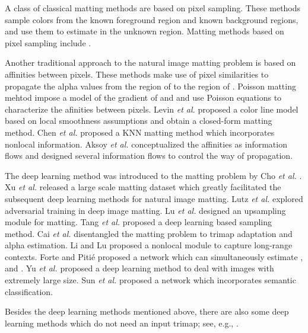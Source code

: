 \documentclass{article}
\theoremstyle{plain}
\begin{document}
A class of classical matting methods are based on pixel sampling.
These methods sample colors from the known foreground region and known background regions, and use them to estimate  in the unknown region.
Matting methods based on pixel sampling include
\cite{Chuang2001ABayesianApproach,Wang2007OptimizedColorSampling,Gastal2010SharedSampling,He2011AGlobalSampling,Shahrian2013ImprovingImageMatting,Feng2016AClusterSampling}.

Another traditional approach to the natural image matting problem is based on affinities between pixels.
These methods make use of pixel similarities to propagate the alpha values from the region of  to the region of .
Poisson matting mehtod \cite{Sun2004PoissonMatting} impose a model of the gradient of  and  and use Poisson equations to characterize the afinities between pixels.
Levin \emph{et al.} \cite{Levin2008AClosed-Form} proposed a color line model based on local smoothness assumptions and obtain a closed-form matting method.
Chen \emph{et al.} \cite{Chen2013KNNMatting} proposed a KNN matting method which incorporates nonlocal information.
Aksoy \emph{et al.} \cite{Aksoy2017DesigningEffective} conceptualized the affinities as information flows and designed several information flows to control the way of propagation.

The deep learning method was introduced to the matting problem by
Cho \emph{et al.} \cite{Cho2016NaturalImageMatting}. Xu \emph{et al.} \cite{Xu2017DeepImageMatting} released a large scale matting dataset which greatly facilitated the subsequent deep learning methods for natural image matting.
Lutz \emph{et al.} \cite{Lutz2018AlphaGAN} explored adversarial training in deep image matting.
Lu \emph{et al.} \cite{Lu2019IndicesMatter} designed an upsampling module for matting.
Tang \emph{et al.} \cite{Tang2019Learning-Based} proposed a deep learning based sampling method.
Cai \emph{et al.} \cite{Cai2019Disentangled} disentangled the matting problem to  trimap adaptation and alpha estimation.
Li and Lu \cite{Li2020NaturalImageMatting} proposed a nonlocal module to capture long-range contexts.
Forte and Piti\'e \cite{Forte2020FBA} proposed a network which can simultaneously estimate ,  and .
Yu \emph{et al.} \cite{Yu2021High-ResolutionDeepImageMatting} proposed a deep learning method to deal with images with extremely large size.
Sun \emph{et al.} \cite{Sun2021SemanticImageMatting} proposed a network which incorporates semantic classification.

Besides the deep learning methods mentioned above, there are also some deep learning methods which do not need an input trimap; see, e.g., \cite{Sengupta2020BackgroundMatting,Qiao2020Attention-GuidedHierarchical}.
 
\end{document}
